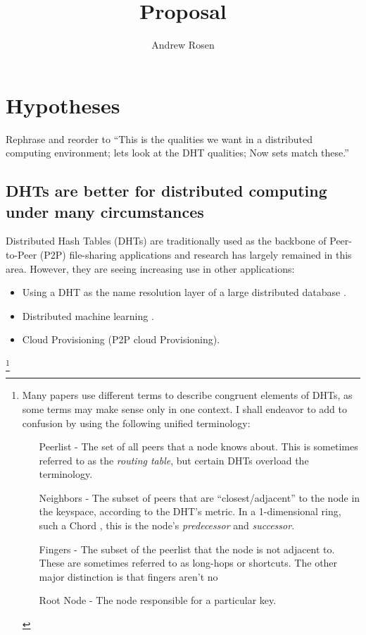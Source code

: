 \documentclass[10pt,letterpaper]{report}
\title{Proposal}
\author{Andrew Rosen}
\begin{document}
\maketitle
\setcounter{tocdepth}{4}
\tableofcontents
\newpage
\chapter{Hypotheses}

Rephrase and reorder to ``This is the qualities we want in a distributed computing environment; lets look at the DHT qualities;  Now sets match these.''


\section{DHTs are better for distributed computing under many circumstances}
Distributed Hash Tables (DHTs) are traditionally used as the backbone of Peer-to-Peer (P2P) file-sharing applications and research has largely remained in this area.
However, they are seeing increasing use in other applications:

\begin{itemize}
    \item Using a DHT as the name resolution layer of a large distributed database \cite{Mateescu2011440}. %
    \item Distributed machine learning \cite{liparameter}.
    \item Cloud Provisioning  (P2P cloud Provisioning).
\end{itemize}



\footnote{
Many papers use different terms to describe congruent elements of DHTs, as some terms may make sense only in one context.
I shall endeavor to add to confusion by using the following unified terminology:
\begin{enumerate}
    \item[Peerlist] -  The set of all peers that a node knows about.  This is sometimes referred to as the \textit{routing table}, but certain DHTs \cite{tapestry} \cite{pastry} overload the terminology.
    \item[Neighbors] - The subset of peers that are ``closest/adjacent'' to the node in the keyspace, according to the DHT's metric.  In a 1-dimensional ring, such a Chord \cite{chord}, this is the node's \textit{predecessor} and \textit{successor}.
    \item[Fingers] - The subset of the peerlist that the node is not adjacent to.  These are sometimes referred to as long-hops or shortcuts. The other major distinction is that fingers aren't no
    \item[Root Node] - The node responsible for a particular key. 
\end{enumerate}
}
\end{document}
